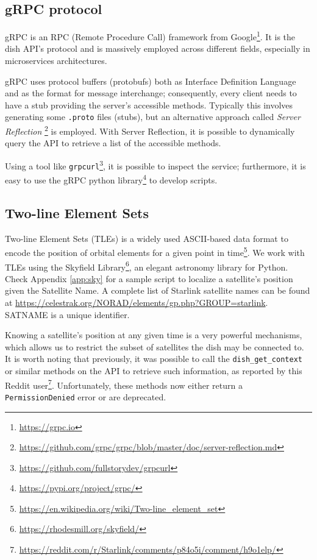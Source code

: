 \documentclass[IN,11pt,twoside,openright,idp,english]{tumthesis}
\begin{document}
\subsection{gRPC protocol}
    
gRPC is an RPC (Remote Procedure Call) framework from Google\footnote{\url{https://grpc.io}}. It is the dish API's
protocol and is massively employed across different fields, especially in microservices architectures. 
    
gRPC uses protocol buffers (protobufs) both as Interface Definition Language and as the format for message interchange;
consequently, every client needs to have a stub providing the server's accessible methods. Typically this involves
generating some \texttt{.proto} files (stubs), but an alternative approach called \textit{Server Reflection}
\footnote{\url{https://github.com/grpc/grpc/blob/master/doc/server-reflection.md}} is employed. With Server Reflection,
it is possible to dynamically query the API to retrieve a list of the accessible methods.

Using a tool like \texttt{grpcurl}\footnote{\url{https://github.com/fullstorydev/grpcurl}}, it is possible to inspect
the service; furthermore, it is easy to use the gRPC python library\footnote{\url{https://pypi.org/project/grpc/}} to
develop scripts.
    
\subsection{Two-line Element Sets}
    
Two-line Element Sets (TLEs) is a widely used ASCII-based data format to encode the position of orbital elements for a
given point in time\footnote{\url{https://en.wikipedia.org/wiki/Two-line_element_set}}. We work with TLEs using the
Skyfield Library\footnote{\url{https://rhodesmill.org/skyfield/}}, an elegant astronomy library for Python. Check
Appendix \ref{app:sky} for a sample script to localize a satellite's position given the Satellite Name. A complete list
of Starlink satellite names can be found at \url{https://celestrak.org/NORAD/elements/gp.php?GROUP=starlink}. 
SATNAME is a unique identifier.
    
Knowing a satellite's position at any given time is a very powerful mechanisms, which allows us to restrict the subset
of satellites the dish may be connected to. It is worth noting that previously, it was possible to call the
\texttt{dish\_get\_context} or similar methods on the API to retrieve such information, as reported by this Reddit
user\footnote{\url{https://reddit.com/r/Starlink/comments/p84o5i/comment/h9o1elp/}}. Unfortunately, these methods now
either return a \texttt{PermissionDenied} error or are deprecated.
    
\end{document}

